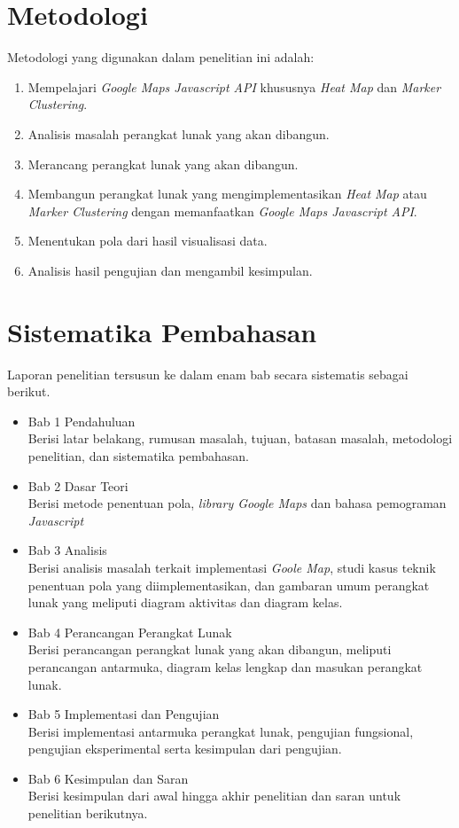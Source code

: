 \section{Metodologi}
\label{sec:metlit}
Metodologi yang digunakan dalam penelitian ini adalah:
	\begin{enumerate}

		\item Mempelajari \textit{Google Maps Javascript API} khususnya \textit{Heat Map} dan \textit{Marker Clustering}.
		\item Analisis masalah perangkat lunak yang akan dibangun.
		\item Merancang perangkat lunak yang akan dibangun.
		\item Membangun perangkat lunak yang mengimplementasikan \textit{Heat Map} atau \textit{Marker Clustering} dengan memanfaatkan \textit{Google Maps Javascript API}.
		\item Menentukan pola dari hasil visualisasi data.
		\item Analisis hasil pengujian dan mengambil kesimpulan.
	\end{enumerate}


\section{Sistematika Pembahasan}
\label{sec:sispem}
Laporan penelitian tersusun ke dalam enam bab secara sistematis sebagai berikut.
\begin{itemize}
    \item Bab 1 Pendahuluan\\
    Berisi latar belakang, rumusan masalah, tujuan, batasan masalah, metodologi penelitian, dan sistematika pembahasan.
   
   \item Bab 2 Dasar Teori\\
    Berisi  metode penentuan pola, \textit{library Google Maps} dan bahasa pemograman \textit{Javascript}
   
    \item Bab 3 Analisis\\
    Berisi analisis masalah terkait implementasi \textit{Goole Map}, studi kasus teknik penentuan pola yang diimplementasikan, dan gambaran umum perangkat lunak yang meliputi diagram aktivitas dan diagram kelas.
  
    \item Bab 4 Perancangan Perangkat Lunak\\
    Berisi perancangan perangkat lunak yang akan dibangun, meliputi perancangan antarmuka,
diagram kelas lengkap dan masukan perangkat lunak.
    
    \item Bab 5 Implementasi dan Pengujian\\
Berisi implementasi antarmuka perangkat lunak, pengujian fungsional, pengujian eksperimental
serta kesimpulan dari pengujian.
   
    \item Bab 6 Kesimpulan dan Saran\\
    Berisi kesimpulan dari awal hingga akhir penelitian dan saran untuk penelitian berikutnya.
\end{itemize}